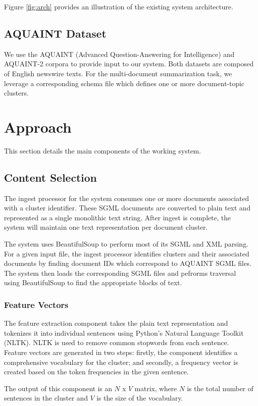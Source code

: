 \documentclass[11pt]{article}
\begin{document}
Figure \ref{fig:arch} provides an illustration of the existing system architecture.

\subsection{AQUAINT Dataset}
We use the AQUAINT (Advanced Question-Answering for Intelligence) and AQUAINT-2 corpora to provide input to our system. Both datasets are composed of English newswire texts. For the multi-document summarization task, we leverage a corresponding schema file which defines one or more document-topic clusters. 

\section{Approach}

This section details the main components of the working system.

\subsection{Content Selection}
The ingest processor for the system consumes one or more documents associated with a cluster identifier. These SGML documents are converted to plain text and represented as a single monolithic text string. After ingest is complete, the system will maintain one text representation per document cluster.

The system uses BeautifulSoup to perform most of its SGML and XML parsing. For a given input file, the ingest processor identifies clusters and their associated documents by finding document IDs which correspond to AQUAINT SGML files. The system then loads the corresponding SGML files and pefrorms traversal using BeautifulSoup to find the appropriate blocks of text.
\subsubsection{Feature Vectors}
The feature extraction component takes the plain text representation and tokenizes it into individual sentences using Python's Natural Language Toolkit (NLTK). NLTK is used to remove common stopwords from each sentence. Feature vectors are generated in two steps: firstly, the component identifies a comprehensive vocabulary for the cluster; and secondly, a frequency vector is created based on the token frequencies in the given sentence. 

The output of this component is an $N$ x $V$ matrix, where $N$ is the total number of sentences in the cluster and $V$ is the size of the vocabulary. 
\end{document}
